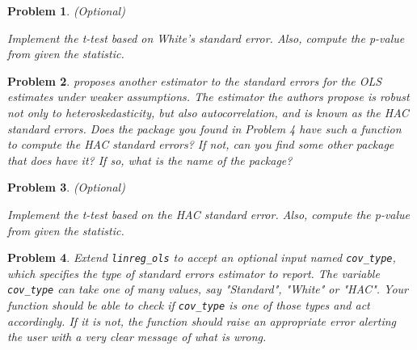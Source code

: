 \documentclass[12pt, a4paper]{article}
\newtheorem{problem}{Problem}
\begin{document}
\begin{problem}
(Optional)

Implement the t-test based on White's standard error. Also, compute the p-value from given the statistic.
\end{problem}

\begin{problem}
\citet{NW1987} proposes another estimator to the standard errors for the OLS estimates under weaker assumptions.
The estimator the authors propose is robust not only to heteroskedasticity, but also autocorrelation, and is known as the HAC standard errors.
Does the package you found in Problem 4 have such a function to compute the HAC standard errors?
If not, can you find some other package that does have it?
If so, what is the name of the package?
\end{problem}

\begin{problem}
(Optional)

Implement the t-test based on the HAC standard error. Also, compute the p-value from given the statistic.
\end{problem}

\begin{problem}
Extend \texttt{linreg\_ols} to accept an optional input named \texttt{cov\_type}, which specifies the type of standard errors estimator to report.
The variable \texttt{cov\_type} can take one of many values, say "Standard", "White" or "HAC".
Your function should be able to check if \texttt{cov\_type} is one of those types and act accordingly.
If it is not, the function should raise an appropriate error alerting the user with a very clear message of what is wrong.
\end{problem}
\newpage
\printbibliography
\newpage
\end{document}
